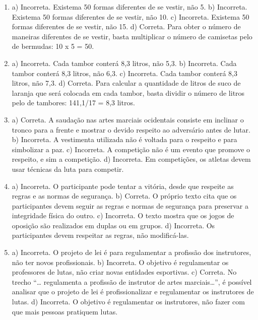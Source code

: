 \begin{enumerate}
\item
a) Incorreta. Existema 50 formas diferentes de se vestir, não 5.
b) Incorreta. Existema 50 formas diferentes de se vestir, não 10.
c) Incorreta. Existema 50 formas diferentes de se vestir, não 15.
d) Correta. Para obter o número de maneiras diferentes de se vestir, 
basta multiplicar o número de camisetas pelo de bermudas: 10 x 5 = 50.

\item
a) Incorreta. Cada tambor conterá 8,3 litros, não 5,3.
b) Incorreta. Cada tambor conterá 8,3 litros, não 6,3.
c) Incorreta. Cada tambor conterá 8,3 litros, não 7,3.
d) Correta. Para calcular a quantidade de litros de suco de laranja
que será colocada em cada tambor, basta dividir o número de litros pelo
de tambores: 141,1/17 = 8,3 litros.

\item
a) Correta. A saudação nas artes marciais ocidentais consiste em
inclinar o tronco para a frente e mostrar o devido respeito ao adversário
antes de lutar.
b) Incorreta. A vestimenta utilizada não é voltada para o
respeito e para simbolizar a paz.
c) Incorreta. A competição não é um evento que promove o
respeito, e sim a competição.
d) Incorreta. Em competições, os atletas devem usar técnicas da
luta para competir.

\item
a) Incorreta. O participante pode tentar a vitória, desde que
respeite as regras e as normas de segurança.
b) Correta. O próprio texto cita que os participantes devem
seguir as regras e normas de segurança para preservar a integridade
física do outro.
c) Incorreta. O texto mostra que os jogos de oposição são
realizados em duplas ou em grupos.
d) Incorreta. Os participantes devem respeitar as regras, não modificá-las.

\item
a) Incorreta. O projeto de lei é para regulamentar a profissão dos
instrutores, não ter novos profissionais.
b) Incorreta. O objetivo é regulamentar os professores de lutas, não criar novas entidades esportivas.
c) Correta. No trecho “\ldots{} regulamenta a profissão de instrutor
de artes marciais\ldots{}”, é possível analisar que o projeto de lei é
profissionalizar e regulamentar os instrutores de lutas.
d) Incorreta. O objetivo é regulamentar os instrutores, não
fazer com que mais pessoas pratiquem lutas.


\end{enumerate}

